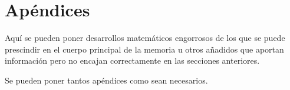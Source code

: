 \chapter{Apéndices}

Aquí se pueden poner desarrollos matemáticos engorrosos de los que se puede prescindir en el cuerpo principal de la memoria u otros añadidos que aportan información pero no encajan correctamente en las secciones anteriores.

\vspace{\baselineskip}

Se pueden poner tantos apéndices como sean necesarios.